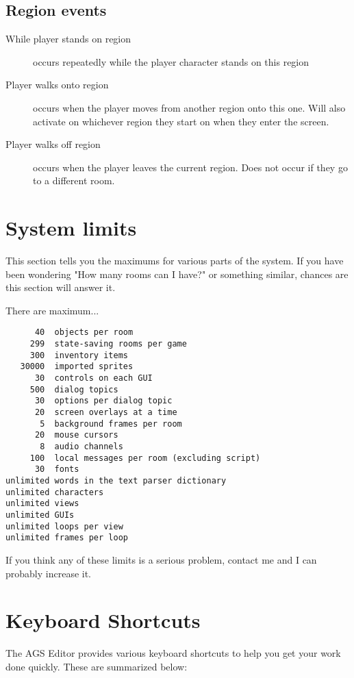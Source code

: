 \subsection{Region events}%

\begin{description}
\item [While player stands on region] occurs repeatedly while the player character stands on this region
\item [Player walks onto region] occurs when the player moves from another region onto this one. Will
  also activate on whichever region they start on when they enter the screen.
\item [Player walks off region] occurs when the player leaves the current region. Does not occur
  if they go to a different room.
\end{description}



\section{System limits}%

This section tells you the maximums for various parts of the system. If you
have been wondering "How many rooms can I have?" or something similar,
chances are this section will answer it.

There are maximum...
\begin{verbatim}
      40  objects per room
     299  state-saving rooms per game
     300  inventory items
   30000  imported sprites
      30  controls on each GUI
     500  dialog topics
      30  options per dialog topic
      20  screen overlays at a time
       5  background frames per room
      20  mouse cursors
       8  audio channels
     100  local messages per room (excluding script)
      30  fonts
unlimited words in the text parser dictionary
unlimited characters
unlimited views
unlimited GUIs
unlimited loops per view
unlimited frames per loop
\end{verbatim}

If you think any of these limits is a serious problem, contact me and I can
probably increase it.

\section{Keyboard Shortcuts}\label{KeyboardShortcuts}%

The AGS Editor provides various keyboard shortcuts to help you get your work done quickly.
These are summarized below:

